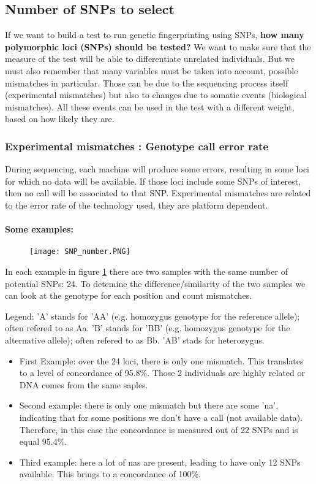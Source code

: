 \subsection{Number of SNPs to select} 

If we want to build a test to run genetic fingerprinting using SNPs, \textbf{how many polymorphic loci (SNPs) should be tested?} 
We want to make sure that the measure of the test will be able to differentiate unrelated individuals. 
But we must also remember that many variables must be taken into account, possible mismatches in particular. Those can be due to the sequencing process itself (experimental mismatches) but also to changes due to somatic events (biological mismatches). All these events can be used in the test with a different weight, based on how likely they are. 


\subsubsection{Experimental mismatches : Genotype call error rate}

During sequencing, each machine will produce some errors, resulting in some loci for which no data will be available. If those loci include some SNPs of interest, then no call will be associated to that SNP. 
Experimental mismatches are related to the error rate of the technology used, they are platform dependent. 

\paragraph{Some examples:}

\begin{figure}
	\centering
	\texttt{[image: SNP\_number.PNG]}
	\caption{\label{fig:SNP_number}}
\end{figure}

In each example in figure \ref{fig:SNP_number} there are two samples with the same number of potential SNPs: 24. To detemine the difference/similarity of the two samples we can look at the genotype for each position and count mismatches.

Legend: 
'A' stands for 'AA' (e.g. homozygus genotype for the reference allele); often refered to as Aa.
'B' stands for 'BB' (e.g. homozygus genotype for the alternative allele); often refered to as Bb.
'AB' stads for heterozygus.

\begin{itemize}
	\item First Example: over the 24 loci, there is only one mismatch. This translates to a level of concordance of 95.8\%. Those 2 individuals are highly related or DNA comes from the same saples.    
	\item Second example: there is only one mismatch but there are some 'na', indicating that for some positions we don't have a call (not available data). Therefore, in this case the concordance is measured out of 22 SNPs and is equal 95.4\%. 
	\item Third example: here a lot of nas are present, leading to have only 12 SNPs available. This brings to a concordance of 100\%. 
\end{itemize}

